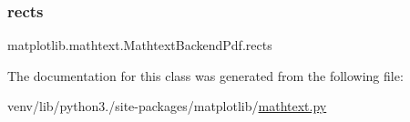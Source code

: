\subsubsection{\texorpdfstring{rects}{rects}}
{\footnotesize\ttfamily matplotlib.\+mathtext.\+Mathtext\+Backend\+Pdf.\+rects}



The documentation for this class was generated from the following file\+:\begin{DoxyCompactItemize}
\item 
venv/lib/python3./site-\/packages/matplotlib/\hyperlink{mathtext_8py}{mathtext.\+py}\end{DoxyCompactItemize}
